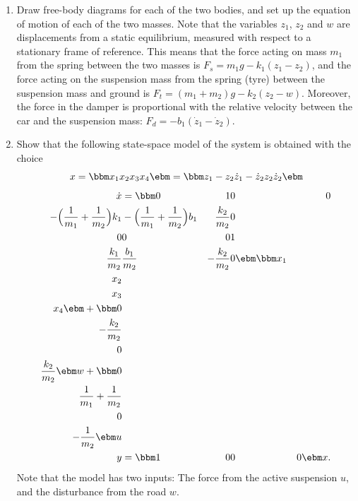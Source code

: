 \documentclass{scrartcl}
\begin{document}
\begin{enumerate}
\item Draw free-body diagrams for each of the two bodies, and set up the equation of motion of each of the two masses. Note that the variables \(z_1\), \(z_2\) and \(w\) are displacements from a static equilibrium, measured with respect to a stationary frame of reference. This means that the force acting on mass \(m_1\) from the spring between the two masses is \(F_s = m_1g -k_1(z_1-z_2)\), and the force acting on the suspension mass from the spring (tyre) between the suspension mass and ground is \(F_t= (m_1+m_2)g - k_2(z_2 - w)\). Moreover, the force in the damper is proportional with the relative velocity between the car and the suspension mass: \(F_d = -b_1(\dot{z}_1 - \dot{z}_2)\).
\item Show that the following state-space model of the system is obtained with the choice 
\[ x = \bbm x_1\\x_2\\x_3\\x_4 \ebm = \bbm z_1 - z_2\\ \dot{z}_1 - \dot{z}_2 \\ z_2\\ \dot{z}_2 \ebm \]
\begin{align*}
\dot{x} &= \bbm 0 & 1 & 0 & 0\\ 
-\Big(\frac{1}{m_1} + \frac{1}{m_2}\Big)k_1 & -\Big(\frac{1}{m_1} + \frac{1}{m_2}\Big)b_1 & \frac{k_2}{m_2} & 0\\
0 & 0 & 0 & 1\\
              \frac{k_1}{m_2} & \frac{b_1}{m_2} & - \frac{k_2}{m_2} & 0\ebm
              \bbm x_1\\x_2\\x_3\\x_4 \ebm + \bbm 0\\-\frac{k_2}{m_2}\\0\\\frac{k_2}{m_2} \ebm w + \bbm 0\\\frac{1}{m_1} + \frac{1}{m_2}\\0\\-\frac{1}{m_2} \ebm u \\
y &= \bbm 1 & 0 & 0 & 0 \ebm x.
\end{align*}
Note that the model has two inputs: The force from the active suspension \(u\), and the disturbance from the road \(w\).
\end{enumerate}
\end{document}
